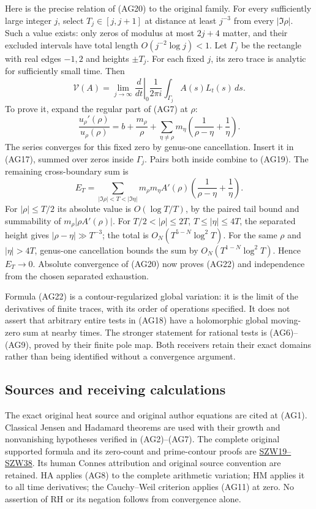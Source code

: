 \documentclass[
  10pt,
  a4paper,
]{article}
\begin{document}
Here is the precise relation of (AG20) to the original family. For every
sufficiently large integer \(j\), select \(T_j\in[j,j+1]\) at distance
at least \(j^{-3}\) from every \(|\Im\rho|\). Such a value exists: only
zeros of modulus at most \(2j+4\) matter, and their excluded intervals
have total length \(O(j^{-2}\log j)<1\). Let \(\Gamma_j\) be the
rectangle with real edges \(-1,2\) and heights \(\pm T_j\). For each
fixed \(j\), its zero trace is analytic for sufficiently small time.
Then \[
\boxed{\mathcal V(A)=\lim_{j\to\infty}
\left.\frac d{dt}\right|_0\frac1{2\pi i}\int_{\Gamma_j}A(s)L_t(s)\,ds.}
\tag{AG22}
\] To prove it, expand the regular part of (AG7) at \(\rho\): \[
\frac{u_\rho'(\rho)}{u_\rho(\rho)}
=b+\frac{m_\rho}\rho+
\sum_{\eta\ne\rho}m_\eta\left(\frac1{\rho-\eta}+\frac1\eta\right).
\tag{AG23}
\] The series converges for this fixed zero by genus-one cancellation.
Insert it in (AG17), summed over zeros inside \(\Gamma_j\). Pairs both
inside combine to (AG19). The remaining cross-boundary sum is \[
E_T=\sum_{|\Im\rho|<T<|\Im\eta|}
m_\rho m_\eta A'(\rho)
\left(\frac1{\rho-\eta}+\frac1\eta\right).
\tag{AG24}
\] For \(|\rho|\le T/2\) its absolute value is \(O(\log T/T)\), by the
paired tail bound and summability of \(m_\rho|\rho A'(\rho)|\). For
\(T/2<|\rho|\le2T\), \(T\le|\eta|\le4T\), the separated height gives
\(|\rho-\eta|\gg T^{-3}\); the total is \(O_N(T^{5-N}\log^2T)\). For the
same \(\rho\) and \(|\eta|>4T\), genus-one cancellation bounds the sum
by \(O_N(T^{1-N}\log^2T)\). Hence \(E_T\to0\). Absolute convergence of
(AG20) now proves (AG22) and independence from the chosen separated
exhaustion.

Formula (AG22) is a contour-regularized global variation: it is the
limit of the derivatives of finite traces, with its order of operations
specified. It does not assert that arbitrary entire tests in (AG18) have
a holomorphic global moving-zero sum at nearby times. The stronger
statement for rational tests is (AG6)--(AG9), proved by their finite
pole map. Both receivers retain their exact domains rather than being
identified without a convergence argument.

\subsection{Sources and receiving
calculations}\label{sources-and-receiving-calculations}

The exact original heat source and original author equations are cited
at (AG1). Classical Jensen and Hadamard theorems are used with their
growth and nonvanishing hypotheses verified in (AG2)--(AG7). The
complete original supported formula and its zero-count and prime-contour
proofs are
\href{https://github.com/KokunoYumeto/zeta-function-research-reader/blob/3c022a0adde0a6aa3d8fc8e43ef42795d88e44b0/workbenches/splitzero-tandem/branches/tau-zero-prime-positivity/SUPPORTED_ZERO_PRIME_WEIL_DERIVATION.md}{SZW19--SZW38}.
Its human Connes attribution and original source convention are
retained. HA applies (AG8) to the complete arithmetic variation; HM
applies it to all time derivatives; the Cauchy--Weil criterion applies
(AG11) at zero. No assertion of RH or its negation follows from
convergence alone.
\end{document}
